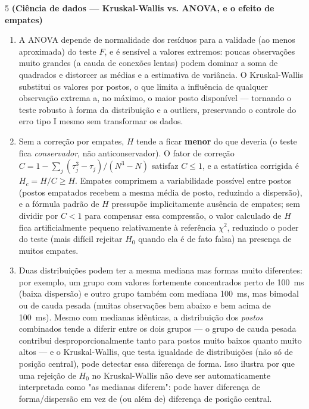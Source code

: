 \documentclass[11pt]{article}
\begin{document}
\begin{questao}{5} \textbf{(Ciência de dados --- Kruskal-Wallis vs. ANOVA, e o efeito de empates)}
\end{questao}
\begin{solucao}
\begin{enumerate}[label=(\alph*)]
  \item A ANOVA depende de normalidade dos resíduos para a validade (ao menos aproximada) do
    teste $F$, e é sensível a valores extremos: poucas observações muito grandes (a cauda de
    conexões lentas) podem dominar a soma de quadrados e distorcer as médias e a estimativa de
    variância. O Kruskal-Wallis substitui os valores por postos, o que limita a influência de
    qualquer observação extrema a, no máximo, o maior posto disponível --- tornando o teste
    robusto à forma da distribuição e a outliers, preservando o controle do erro tipo I mesmo sem
    transformar os dados.
  \item Sem a correção por empates, $H$ tende a ficar \textbf{menor} do que deveria (o teste fica
    \emph{conservador}, não anticonservador). O fator de correção $C = 1-\sum_j(\tau_j^3-\tau_j)/
    (N^3-N)$ satisfaz $C \leq 1$, e a estatística corrigida é $H_c = H/C \geq H$. Empates
    comprimem a variabilidade possível entre postos (postos empatados recebem a mesma média de
    posto, reduzindo a dispersão), e a fórmula padrão de $H$ pressupõe implicitamente ausência de
    empates; sem dividir por $C<1$ para compensar essa compressão, o valor calculado de $H$ fica
    artificialmente pequeno relativamente à referência $\chi^2$, reduzindo o poder do teste
    (mais difícil rejeitar $H_0$ quando ela é de fato falsa) na presença de muitos empates.
  \item Duas distribuições podem ter a mesma mediana mas formas muito diferentes: por exemplo,
    um grupo com valores fortemente concentrados perto de 100~ms (baixa dispersão) e outro grupo
    também com mediana 100~ms, mas bimodal ou de cauda pesada (muitas observações bem abaixo e
    bem acima de 100~ms). Mesmo com medianas idênticas, a distribuição dos \emph{postos}
    combinados tende a diferir entre os dois grupos --- o grupo de cauda pesada contribui
    desproporcionalmente tanto para postos muito baixos quanto muito altos --- e o
    Kruskal-Wallis, que testa igualdade de distribuições (não só de posição central), pode
    detectar essa diferença de forma. Isso ilustra por que uma rejeição de $H_0$ no
    Kruskal-Wallis não deve ser automaticamente interpretada como "as medianas diferem": pode
    haver diferença de forma/dispersão em vez de (ou além de) diferença de posição central.
\end{enumerate}
\end{solucao}
\end{document}
